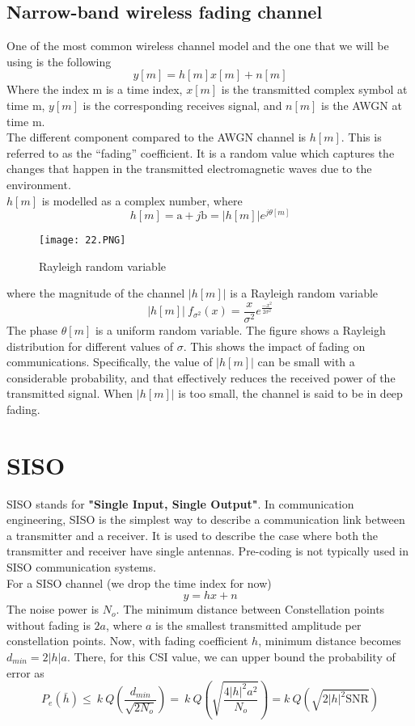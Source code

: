 \subsection{Narrow-band wireless fading channel}
One of the most common wireless channel model and the one that we will be using is the following
\[y[m]=h[m]x[m]+n[m]\]
Where the index m is a time index, $x[m]$ is the transmitted complex symbol at time m, $y[m]$ is the corresponding receives signal, and $n[m]$ is the AWGN at time m.\\
The different component compared to the AWGN channel is $h[m]$. This is referred to as the “fading” coefficient. It is a random value which captures the changes that happen in the transmitted electromagnetic waves due to the environment. \\
$h[m]$ is modelled as a complex number, where
\begin{equation}
    \label{eq:h channel}
    h[m]=\text{a}+j\text{b}= |h[m]| e^{j\theta[m]}
\end{equation}
\begin{wrapfigure}{h}{0.4\textwidth}
    \texttt{[image: 22.PNG]}
  \caption{Rayleigh random variable}
\end{wrapfigure}
where the magnitude of the channel $|h[m]|$ is a Rayleigh random variable
\[|h[m]|  ~ f_{\sigma^2}(x)=\frac{x}{\sigma^2}  e^{\frac{-x^2}{2\sigma^2 }}\]  
The phase $\theta[m]$ is a uniform random variable.
The figure shows a Rayleigh distribution for different values of $\sigma$. This shows the impact of fading on communications. Specifically, the value of $|h[m]|$ can be small with a considerable probability, and that effectively reduces the received power of the transmitted signal. When $|h[m]|$  is too small, the channel is said to be in deep fading. 

\section{SISO}
SISO stands for \textbf{"Single Input, Single Output"}. In communication engineering, SISO is the simplest way to describe a communication link between a transmitter and a receiver. It is used to describe the case where both the transmitter and receiver have single antennas. Pre-coding is not typically used in SISO communication systems. \\
For a SISO channel (we drop the time index for now)
\begin{equation}
    \label{eq:simplest channel model}
    y = hx + n
\end{equation}
The noise power is $N_o$. The minimum distance between Constellation points without fading is $2a$, where $a$ is the smallest transmitted amplitude per constellation points.
Now, with fading coefficient $h$, minimum distance becomes $d_{min}=2|h|a$. There, for this CSI value, we can upper bound the probability of error as
\begin{equation}
    \label{eq:upper bound Pe for SISO}
    P_e\left(\bar{h}\right)\le\ k\ Q\left(\frac{d_{min}}{\sqrt{2N_o}}\right)=\ k\ Q\left(\sqrt{\frac{4\left|h\right|^2a^2}{N_o}}\right)=k\ Q\left(\sqrt{2\left|h\right|^2\text{SNR}}\right)
\end{equation}

